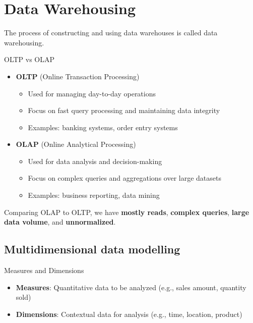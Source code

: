 \section{Data Warehousing}

The process of constructing and using data warehouses is called data warehousing.

\begin{knBox}
    {OLTP vs OLAP}

    \begin{itemize}
        \item \textbf{OLTP} (Online Transaction Processing)
              \begin{itemize}
                  \item Used for managing day-to-day operations
                  \item Focus on fast query processing and maintaining data integrity
                  \item Examples: banking systems, order entry systems
              \end{itemize}
        \item \textbf{OLAP} (Online Analytical Processing)
              \begin{itemize}
                  \item Used for data analysis and decision-making
                  \item Focus on complex queries and aggregations over large datasets
                  \item Examples: business reporting, data mining
              \end{itemize}
    \end{itemize}

    Comparing OLAP to OLTP, we have \textbf{mostly reads}, \textbf{complex queries}, \textbf{large data volume}, and \textbf{unnormalized}.
\end{knBox}

\subsection{Multidimensional data modelling}

\begin{definition}
    {Measures and Dimensions}
    \begin{itemize}
        \item \textbf{Measures}: Quantitative data to be analyzed (e.g., sales amount, quantity sold)
        \item \textbf{Dimensions}: Contextual data for analysis (e.g., time, location, product)
    \end{itemize}
\end{definition}

